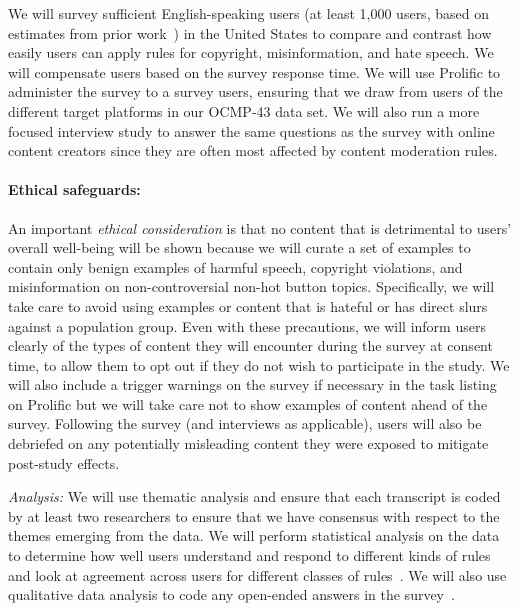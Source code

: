 We will survey sufficient English-speaking users (at least 1,000 users, based
on estimates from prior work~\cite{mathur_endorsements_2018}) in the
United States to compare and contrast how easily users can apply rules
for copyright, misinformation, and hate speech. We will compensate users based on the
survey response time. We will use Prolific to
administer the survey to a survey users, ensuring that we draw
from users of the different target platforms in our OCMP-43 data set. We will also run a more focused interview study to answer the same questions as the survey with online content creators since they are often most affected by content moderation rules. 

\paragraph{Ethical safeguards:} An important \textit{ethical consideration} is
that no content that is detrimental to users' overall well-being will be shown
because we will curate a set of examples to contain only benign examples of
harmful speech, copyright violations, and misinformation on
non-controversial non-hot button topics.  Specifically, we will take care to
avoid using examples or content that is hateful or has direct slurs against a
population group. Even with these precautions, we will inform users clearly of
the types of content they will encounter during the survey at consent time, to
allow them to opt out if they do not wish to participate in the study. We will
also include a trigger warnings on the survey if necessary in the task listing
on Prolific but we will take care not to show examples of content ahead of the
survey. Following the survey (and interviews as applicable), users will also
be debriefed on any potentially misleading content they were exposed to
mitigate post-study effects.


\textit{Analysis:} We will use thematic analysis and ensure that each
transcript is coded by at least two researchers to ensure that we have
consensus with respect to the themes emerging from the data.  We will perform
statistical analysis on the data to determine how well users understand and
respond to different kinds of rules and look at agreement across users for
different classes of rules~\cite{lazar2017research}. We will also use
qualitative data analysis to code any open-ended answers in the
survey~\cite{saldana_coding_2013}. 


